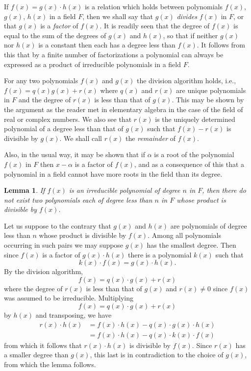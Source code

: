\documentclass[10pt,leqno,a5paper]{book}
\newtheorem*{lemm*}{Lemma}
\theoremstyle{definition}
\begin{document}
If $f(x) = g(x) \cdot h(x)$ is a relation which holds between polynomials $f(x)$, $g(x)$, $h(x)$ in a field $F$, then we shall say that $g(x)$ \emph{divides} $f(x)$ in $F$, or that $g(x)$ is a \emph{factor} of $f(x)$.
It is readily seen that the degree of $f(x)$ is equal to the sum of the degrees of $g(x)$ and $h(x)$, so that if neither $g(x)$ nor $h(x)$ is a constant then each has a degree less than $f(x)$.
It follows from this that by a finite number of factorizations a polynomial can always be expressed as a product of irreducible polynomials in a field $F$.

For any two polynomials $f(x)$ and $g(x)$ the division algorithm holds, i.e., $f(x) = q(x) g(x) + r(x)$ where $q(x)$ and $r(x)$ are unique polynomials in $F$ and the degree of $r(x)$ is less than that of $g(x)$.
This may be shown by the argument as the reader met in elementary algebra in the case of the field of real or complex numbers.
We also see that $r(x)$ is the uniquely determined polynomial of a degree less than that of $g(x)$ such that $f(x) - r(x)$ is divisible by $g(x)$.
We shall call $r(x)$ the \emph{remainder} of $f(x)$.

Also, in the usual way, it may be shown that if $\alpha$ is a root of the polynomial $f(x)$ in $F$ then $x - \alpha$ is a factor of $f(x)$, and as a consequence of this that a polynomial in a field cannot have more roots in the field than its degree.


\begin{lemm*}
\label{lemm:p24}
If $f(x)$ is an irreducible polynomial of degree $n$ in $F$, then there do not exist two polynomials each of degree less than $n$ in $F$ whose product is divisible by $f(x)$.
\end{lemm*}

Let us suppose to the contrary that $g(x)$ and $h(x)$ are polynomials of degree less than $n$ whose product is divisible by $f(x)$.
Among all polynomials occurring in such pairs we may suppose $g(x)$ has the smallest degree.
Then since $f(x)$ is a factor of $g(x) \cdot h(x)$ there is a polynomial $k(x)$ such that
\[
k(x) \cdot f(x) = g(x) \cdot h(x).
\]
By the division algorithm,
\[
f(x) = q(x) \cdot g(x) + r(x)
\]
where the degree of $r(x)$ is less than that of $g(x)$ and $r(x) \not= 0$ since $f(x)$ was assumed to be irreducible.
Multiplying
\[
f(x) = q(x) \cdot g(x) + r(x)
\]
by $h(x)$ and transposing, we have
\begin{align*}
r(x) \cdot h(x)
&= f(x) \cdot h(x) - q(x) \cdot g(x) \cdot h(x)
\\
&= f(x) \cdot h(x) - q(x) \cdot k(x) \cdot f(x)
\end{align*}
from which it follows that $r(x) \cdot h(x)$ is divisible by $f(x)$.
Since $r(x)$ has a smaller degree than $g(x)$, this last is in contradiction to the choice of $g(x)$, from which the lemma follows.
\end{document}
